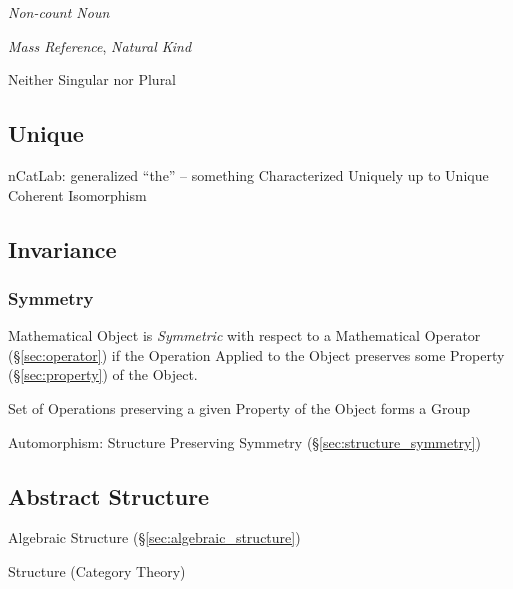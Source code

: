 \emph{Non-count Noun}

\emph{Mass Reference}, \emph{Natural Kind}

Neither Singular nor Plural



\subsection{Unique}\label{sec:unique}

nCatLab: generalized ``the'' -- something Characterized Uniquely up to
Unique Coherent Isomorphism %



\subsection{Invariance}\label{sec:invariance}

\subsubsection{Symmetry}\label{sec:symmetry}

Mathematical Object is \emph{Symmetric} with respect to a Mathematical
Operator (\S\ref{sec:operator}) if the Operation Applied to the Object
preserves some Property (\S\ref{sec:property}) of the Object.

Set of Operations preserving a given Property of the Object forms a
Group %

Automorphism: Structure Preserving Symmetry
(\S\ref{sec:structure_symmetry})



\subsection{Abstract Structure}\label{sec:abstract_structure}


Algebraic Structure (\S\ref{sec:algebraic_structure})

Structure (Category Theory) %

